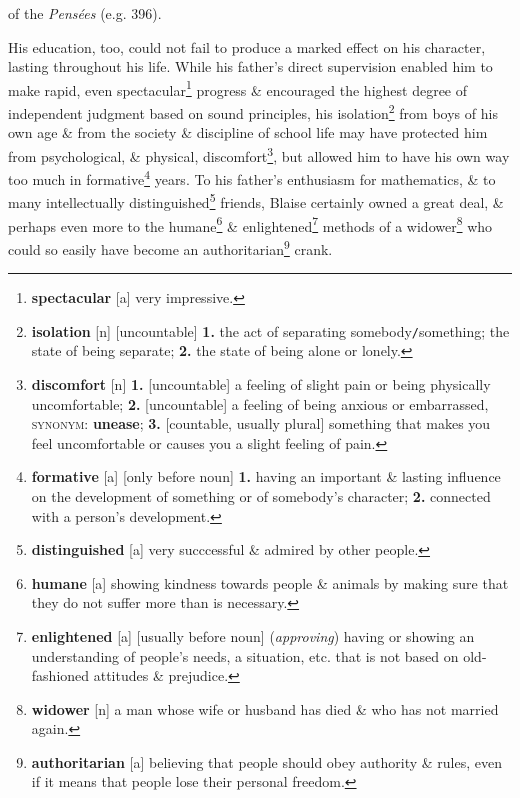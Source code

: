 \documentclass[oneside]{book}
\numberwithin{equation}{section}
\begin{document}
of the \textit{Pens\'ees} (e.g. 396).

His education, too, could not fail to produce a marked effect on his character, lasting throughout his life. While his father's direct supervision enabled him to make rapid, even spectacular\footnote{\textbf{spectacular} [a] very impressive.} progress \& encouraged the highest degree of independent judgment based on sound principles, his isolation\footnote{\textbf{isolation} [n] [uncountable] \textbf{1.} the act of separating somebody\texttt{/}something; the state of being separate; \textbf{2.} the state of being alone or lonely.} from boys of his own age \& from the society \& discipline of school life may have protected him from psychological, \& physical, discomfort\footnote{\textbf{discomfort} [n] \textbf{1.} [uncountable] a feeling of slight pain or being physically uncomfortable; \textbf{2.} [uncountable] a feeling of being anxious or embarrassed, \textsc{synonym}: \textbf{unease}; \textbf{3.} [countable, usually plural] something that makes you feel uncomfortable or causes you a slight feeling of pain.}, but allowed him to have his own way too much in formative\footnote{\textbf{formative} [a] [only before noun] \textbf{1.} having an important \& lasting influence on the development of something or of somebody's character; \textbf{2.} connected with a person's development.} years. To his father's enthusiasm for mathematics, \& to many intellectually distinguished\footnote{\textbf{distinguished} [a] very succcessful \& admired by other people.} friends, Blaise certainly owned a great deal, \& perhaps even more to the humane\footnote{\textbf{humane} [a] showing kindness towards people \& animals by making sure that they do not suffer more than is necessary.} \& enlightened\footnote{\textbf{enlightened} [a] [usually before noun] (\textit{approving}) having or showing an understanding of people's needs, a situation, etc. that is not based on old-fashioned attitudes \& prejudice.} methods of a widower\footnote{\textbf{widower} [n] a man whose wife or husband has died \& who has not married again.} who could so easily have become an authoritarian\footnote{\textbf{authoritarian} [a] believing that people should obey authority \& rules, even if it means that people lose their personal freedom.} crank.
\end{document}
